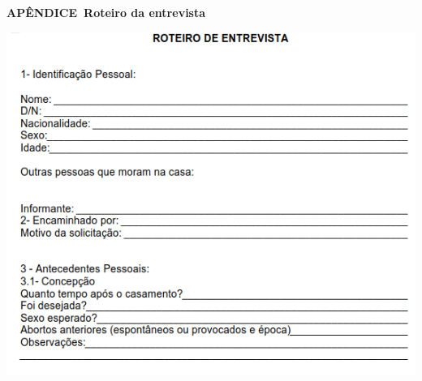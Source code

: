 

    \cleardoublepage
    \thispagestyle{empty}
    \vspace*{\fill}
    \begin{center}
        {\bfseries APÊNDICE~\thechapter{ -- }Roteiro da entrevista}
    \end{center}
    \vspace*{\fill}

\newpage
\centerline{\includegraphics[width=\textwidth]{./PosTexto/Ilustracoes/roteiro}}%